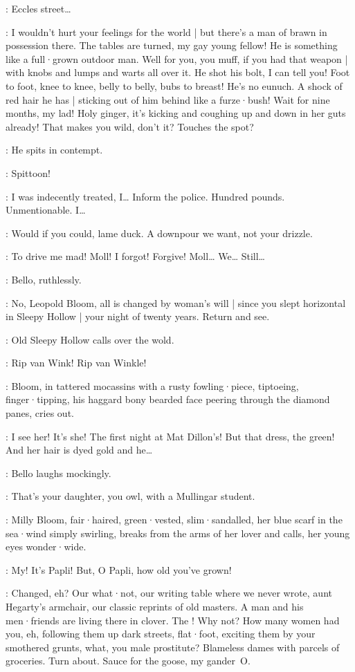 \Bloom:
Eccles street…

\Bello:
I wouldn't hurt your feelings for the world |
but there's a man of brawn in possession there.
The tables are turned,
my gay young fellow!
He is something like a full·grown outdoor man.
Well for you,
you muff,
if you had that weapon |
with knobs and lumps and warts all over it.
He shot his bolt,
I can tell you!
%
Foot to foot,
knee to knee,
belly to belly,
bubs to breast!
He's no eunuch.
A shock of red hair he has |
sticking out of him behind like a furze·bush!
Wait for nine months,
my lad!
Holy ginger,
it's kicking and coughing up and down in her guts already!
That makes you wild,
don't it?
Touches the spot?

:
He spits in contempt.

\Bello:
Spittoon!

\Bloom:
I was indecently treated,
I…
Inform the police.
Hundred pounds.
Unmentionable.
I…

\Bello:
Would if you could,
lame duck.
A downpour we want,
not your drizzle.

\Bloom:
To drive me mad!
Moll!
I forgot!
Forgive!
Moll…
We…
Still…

:
Bello,
ruthlessly.

\Bello:
No,
Leopold Bloom,
all is changed by woman's will |
since you slept horizontal in Sleepy Hollow |
your night of twenty years.
Return and see.

:
Old Sleepy Hollow calls over the wold.

\SleepyHollow:
Rip van Wink!
Rip van Winkle!

:
Bloom,
in tattered mocassins with a rusty fowling·piece,
%
tiptoeing,
finger·tipping,
his haggard bony bearded face peering through the diamond panes,
cries out.

\Bloom:
I see her!
It's she!
The first night at Mat Dillon's!
But that dress,
the green!
And her hair is dyed gold and he…

:
Bello laughs mockingly.

\Bello:
That's your daughter,
you owl,
with a Mullingar student.

:
Milly Bloom,
fair·haired,
green·vested,
slim·sandalled,
her blue scarf in the sea·wind simply swirling,
breaks from the arms of her lover and calls,
her young eyes wonder·wide.

\Milly:
My!
It's Papli!
But,
O Papli,
how old you've grown!

\Bello:
Changed,
eh?
Our what·not,
our writing table where we never wrote,
aunt Hegarty's armchair,
our classic reprints of old masters.
A man and his men·friends are living there in clover.
The !
Why not?
How many women had you,
eh,
following them up dark streets,
flat·foot,
exciting them by your smothered grunts,
what,
you male prostitute?
Blameless dames with parcels of groceries.
Turn about.
Sauce for the goose,
my gander~O.

